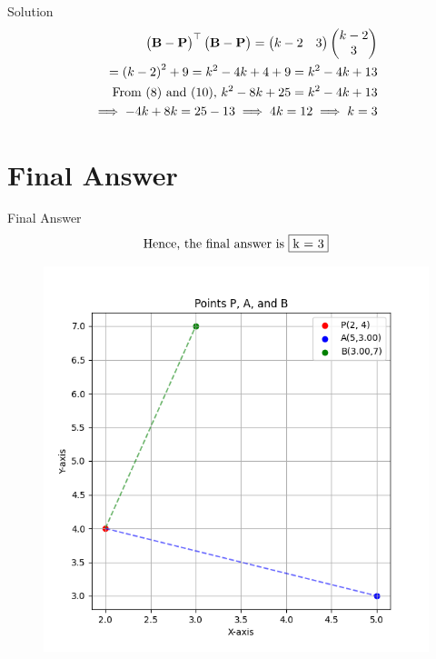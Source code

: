 \documentclass{beamer}
\let\vec\mathbf
\providecommand{\brak}[1]{\ensuremath{\left(#1\right)}}
\theoremstyle{remark}
\newcommand{\myvec}[1]{\ensuremath{\begin{pmatrix}#1\end{pmatrix}}}
\begin{document}
\begin{frame}{Solution}
\begin{align}
    \myvec{\vec{B}-\vec{P}}^{\top}\myvec{\vec{B}-\vec{P}}=\myvec{k-2 &
    3}\myvec{k-2 \\ 3}\\=\brak{k-2}^2 + 9= k^2 - 4k + 4 + 9=k^2 -4k+13\\
    \text{From \brak{8} and \brak{10},   } k^2 - 8k + 25=k^2 -4k+13\\
    \implies-4k+8k=25-13 \implies 4k=12 \implies k=3
\end{align}
\end{frame}


\section{Final Answer}
\begin{frame}{Final Answer}
\begin{align}
    \text{Hence, the final answer is }\fbox{k = 3} 
\end{align}
\begin{figure}
    \centering
    \includegraphics[width=0.6\columnwidth]{figs/1.png}
\end{figure}
\end{frame}
\end{document}
